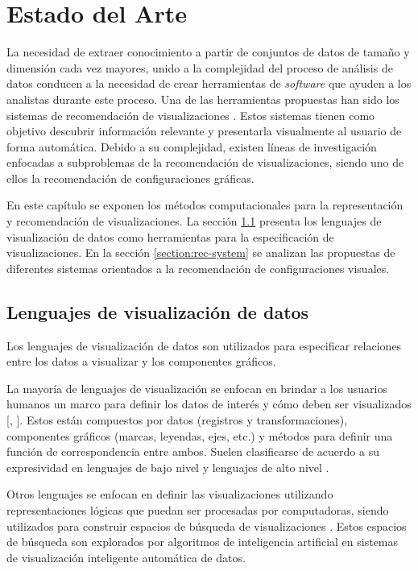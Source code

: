 \chapter{Estado del Arte}\label{chapter:state-of-the-art}

La necesidad de extraer conocimiento a partir de conjuntos de datos
de tama\~no y dimensi\'on cada vez mayores, unido a la complejidad del
proceso de an\'alisis de datos conducen a la necesidad de crear herramientas
de \textit{software} que ayuden a los analistas durante este proceso.
Una de las herramientas propuestas han sido los sistemas de recomendaci\'on de visualizaciones \cite{vartak2017towards}.
Estos sistemas tienen como objetivo descubrir informaci\'on relevante y presentarla visualmente
al usuario de forma autom\'atica. Debido a su complejidad, existen l\'ineas de investigaci\'on
enfocadas a subproblemas de la recomendaci\'on de visualizaciones, siendo uno de ellos
la recomendaci\'on de configuraciones gr\'aficas.

En este cap\'itulo se exponen los m\'etodos computacionales para la representaci\'on 
y recomendaci\'on de visualizaciones. La secci\'on \ref{section:viz-lan} presenta los
lenguajes de visualizaci\'on de datos como herramientas para la especificaci\'on
de visualizaciones. En la secci\'on \ref{section:rec-system} se analizan las propuestas de diferentes sistemas orientados a la
recomendaci\'on de configuraciones visuales.


\section{Lenguajes de visualizaci\'on de datos}\label{section:viz-lan}
Los lenguajes de visualizaci\'on de datos son utilizados para especificar
relaciones entre los datos a visualizar y los componentes gr\'aficos.

La mayor\'ia de lenguajes de visualizaci\'on se enfocan en brindar a los usuarios humanos
un marco para definir los datos de inter\'es y c\'omo deben ser visualizados [\cite*{li2018echarts}, \cite*{tableau}]. 
Estos est\'an compuestos por datos (registros y transformaciones), 
componentes gr\'aficos (marcas, leyendas, ejes, etc.) y
m\'etodos para definir una funci\'on de correspondencia entre ambos. Suelen clasificarse
de acuerdo a su expresividad en lenguajes de bajo nivel y lenguajes de alto nivel \cite{qin2020making}.

Otros lenguajes se enfocan en definir las visualizaciones utilizando
representaciones l\'ogicas que puedan ser procesadas por computadoras, siendo
utilizados para construir espacios de b\'usqueda de visualizaciones \cite{godfrey2016interactive}.
Estos espacios de b\'usqueda son explorados por algoritmos de inteligencia artificial
en sistemas de visualizaci\'on inteligente autom\'atica de datos.


